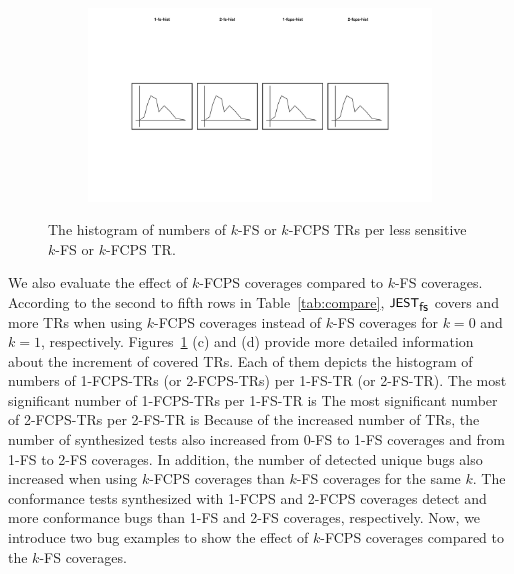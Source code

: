 \begin{figure}
\begin{subfigure}{0.24\textwidth}
  \end{subfigure}
  \begin{subfigure}{0.24\textwidth}
    \centering
    \includegraphics[width=\textwidth]{img/2-fcps-hist}
  \end{subfigure}
  \caption{
    The histogram of numbers of $k$-FS or $k$-FCPS TRs per less sensitive $k$-FS
    or $k$-FCPS TR.
  }
  \label{fig:hist}
\end{figure}


We also evaluate the effect of $k$-FCPS coverages compared to $k$-FS coverages.
%
According to the second to fifth rows in Table~\ref{tab:compare}, $\textsf{\small JEST}_{\textsf{\small fs}}$ covers
 and  more TRs when
using $k$-FCPS coverages instead of $k$-FS coverages for $k = 0$ and $k = 1$,
respectively.
%
Figures~\ref{fig:hist} (c) and (d) provide more detailed information about the
increment of covered TRs.
%
Each of them depicts the histogram of numbers of 1-FCPS-TRs (or 2-FCPS-TRs) per
1-FS-TR (or 2-FS-TR).
%
The most significant number of 1-FCPS-TRs per 1-FS-TR is 
%
%
The most significant number of 2-FCPS-TRs per 2-FS-TR is 
%
Because of the increased number of TRs, the number of synthesized tests also
increased  from 0-FS to 1-FS coverages and
 from 1-FS to 2-FS coverages.
%
In addition, the number of detected unique bugs also increased when using
$k$-FCPS coverages than $k$-FS coverages for the same $k$.
%
The conformance tests synthesized with 1-FCPS and 2-FCPS coverages detect
 and  more conformance bugs than 
1-FS and 2-FS coverages, respectively.
%
Now, we introduce two bug examples to show the effect of $k$-FCPS coverages
compared to the $k$-FS coverages.

